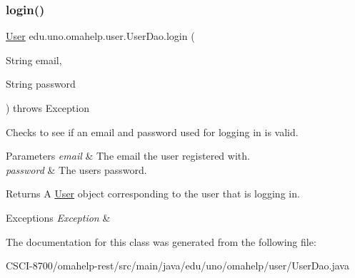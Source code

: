 \subsubsection{\texorpdfstring{login()}{login()}}
{\footnotesize\ttfamily \mbox{\hyperlink{classedu_1_1uno_1_1omahelp_1_1user_1_1_user}{User}} edu.\+uno.\+omahelp.\+user.\+User\+Dao.\+login (\begin{DoxyParamCaption}\item[{String}]{email,  }\item[{String}]{password }\end{DoxyParamCaption}) throws Exception}

Checks to see if an email and password used for logging in is valid.


\begin{DoxyParams}{Parameters}
{\em email} & The email the user registered with. \\
\hline
{\em password} & The user\textquotesingle{}s password. \\
\hline
\end{DoxyParams}
\begin{DoxyReturn}{Returns}
A \mbox{\hyperlink{classedu_1_1uno_1_1omahelp_1_1user_1_1_user}{User}} object corresponding to the user that is logging in. 
\end{DoxyReturn}

\begin{DoxyExceptions}{Exceptions}
{\em Exception} & \\
\hline
\end{DoxyExceptions}


The documentation for this class was generated from the following file\+:\begin{DoxyCompactItemize}
\item 
C\+S\+C\+I-\/8700/omahelp-\/rest/src/main/java/edu/uno/omahelp/user/User\+Dao.\+java\end{DoxyCompactItemize}
